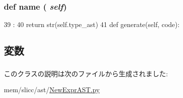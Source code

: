 \hypertarget{classslicc_1_1ast_1_1NewExprAST_1_1NewExprAST_a757840459670ee7692e00cf5ddc722d5}{
\subsubsection[{name}]{\setlength{\rightskip}{0pt plus 5cm}def name ( {\em self})}}
\label{classslicc_1_1ast_1_1NewExprAST_1_1NewExprAST_a757840459670ee7692e00cf5ddc722d5}



\begin{DoxyCode}
39                   :
40         return str(self.type_ast)
41 
    def generate(self, code):
\end{DoxyCode}


\subsection{変数}
\hypertarget{classslicc_1_1ast_1_1NewExprAST_1_1NewExprAST_a2c41e611550596541faa6f64ffecc139}{
\subsubsection[{type\_\-ast}]{}}
\label{classslicc_1_1ast_1_1NewExprAST_1_1NewExprAST_a2c41e611550596541faa6f64ffecc139}


このクラスの説明は次のファイルから生成されました:\begin{DoxyCompactItemize}
\item 
mem/slicc/ast/\hyperlink{NewExprAST_8py}{NewExprAST.py}\end{DoxyCompactItemize}
